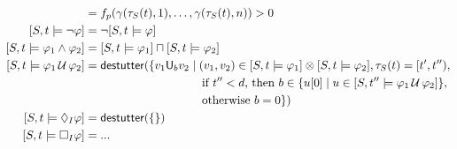 \begin{align*}
	[S,t \models p] &=  f_p(\gamma(\tau_S(t), 1), \ldots, \gamma(\tau_S(t), n)) > 0 \\
	[S,t \models \lnot \varphi] &= \lnot [S,t \models \varphi] \\
	[S,t \models \varphi_1 \land \varphi_2] &= [S,t \models \varphi_1] \sqcap [S,t \models \varphi_2] \\
	[S,t \models \varphi_1 \until \varphi_2] &= \destutter(\{ v_1 \mathsf{U}_{b} v_2 \st (v_1,v_2) \in [S,t \models \varphi_1] \otimes [S,t \models \varphi_2], \tau_S(t) = [t',t''),\\ 
	&\hspace{10em} \text{if $t'' < d$, then } b \in \{ u[0] \st u \in [S,t'' \models \varphi_1 \until \varphi_2] \}, \\
	&\hspace{10em} \text{otherwise } b = 0 \}) \\
	[S,t \models \LTLf_I \varphi] &= \destutter(\{  \}) \\
	[S,t \models \LTLg_I \varphi] &= ...
\end{align*} 


